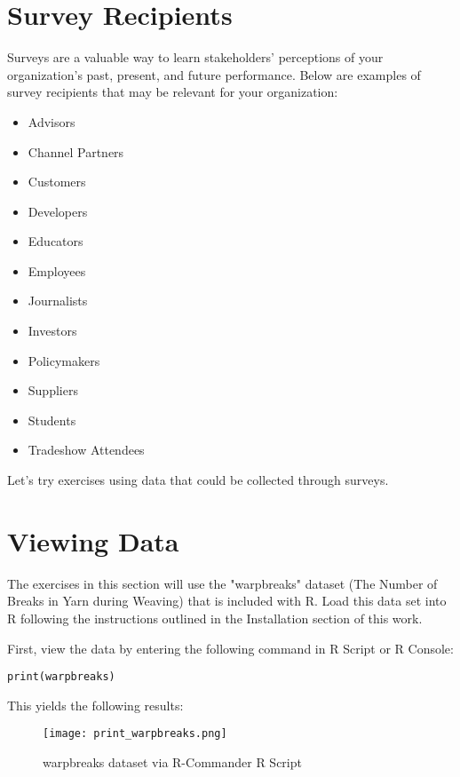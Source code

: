 %
%
%
%
%

\section{Survey Recipients}
Surveys are a valuable way to learn stakeholders' perceptions of your 
organization's past, present, and future performance. Below are examples of 
survey recipients that may be relevant for your organization:

\begin{itemize}
 \item Advisors
 \item Channel Partners
 \item Customers
 \item Developers
 \item Educators
 \item Employees
 \item Journalists
 \item Investors
 \item Policymakers
 \item Suppliers
 \item Students
 \item Tradeshow Attendees
\end{itemize}

Let's try exercises using data that could be collected through surveys.

\section{Viewing Data}
The exercises in this section will use the "warpbreaks" dataset (The Number of 
Breaks in Yarn during Weaving) that is included with R. Load this data set into
 R following the instructions outlined in the Installation section of this work.

First, view the data by entering the following command in R Script or R 
Console:

\texttt{print(warpbreaks)}

This yields the following results:

\begin{figure}[h!]
\texttt{[image: print\_warpbreaks.png]}
 \caption{warpbreaks dataset via R-Commander R Script}
 \label{fig:print_warpbreaks}
\end{figure}

